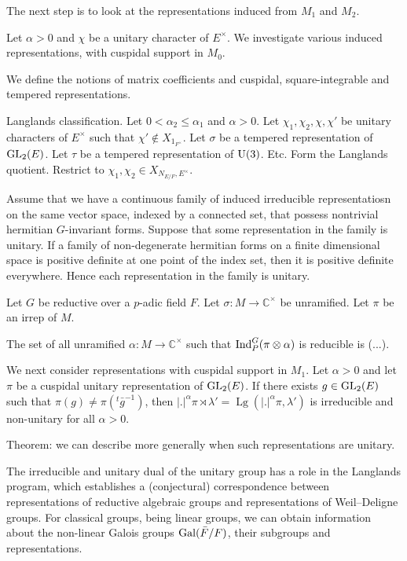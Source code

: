 \documentclass[reqno]{amsart} 
\numberwithin{theorem}{section}
\numberwithin{equation}{section}
\begin{document}
The next step is to look at the representations induced from $M_1$ and $M_2$.

Let $\alpha > 0$ and $\chi$ be a unitary character of $E^\times$.  We investigate various induced representations, with cuspidal support in $M_0$.

We define the notions of matrix coefficients and cuspidal, square-integrable and tempered representations.

Langlands classification.  Let $0 < \alpha_2 \leq \alpha_1$ and $\alpha > 0$.  Let $\chi_1, \chi_2, \chi, \chi '$ be unitary characters of $E^\times$ such that $\chi ' \notin X_{1_{F^\times}}$.  Let $\sigma$ be a tempered representation of $\operatorname{GL}_2(E)$.  Let $\tau$ be a tempered representation of $\operatorname{U}(3)$.  Etc.  Form the Langlands quotient.  Restrict to $\chi_1, \chi_2 \in X_{N_{E/F}, E^\times}$.

\begin{lemma}
  Assume that we have a continuous family of induced irreducible representatiosn on the same vector space, indexed by a connected set, that possess nontrivial hermitian $G$-invariant forms.  Suppose that some representation in the family is unitary.  If a family of non-degenerate hermitian forms on a finite dimensional space is positive definite at one point of the index set, then it is positive definite everywhere.  Hence each representation in the family is unitary.
\end{lemma}

Let $G$ be reductive over a $p$-adic field $F$.  Let $\sigma : M \rightarrow \mathbb{C}^\times$ be unramified.  Let $\pi$ be an irrep of $M$.
\begin{lemma}
  The set of all unramified $\alpha : M \rightarrow \mathbb{C}^\times$ such that $\operatorname{Ind}_P^G(\pi \otimes \alpha)$ is reducible is (...).
\end{lemma}

We next consider representations with cuspidal support in $M_1$.  Let $\alpha > 0$ and let $\pi$ be a cuspidal unitary representation of $\operatorname{GL}_2(E)$.  If there exists $g \in \operatorname{GL}_2(E)$ such that $\pi(g) \neq \pi({}^t \bar{g}^{-1})$, then $\lvert . \rvert^\alpha \pi \rtimes \lambda ' = \operatorname{Lg}(\lvert . \rvert^\alpha \pi, \lambda ')$ is irreducible and non-unitary for all $\alpha > 0$.

Theorem: we can describe more generally when such representations are unitary.

The irreducible and unitary dual of the unitary group has a role in the Langlands program, which establishes a (conjectural) correspondence between representations of reductive algebraic groups and representations of Weil--Deligne groups.  For classical groups, being linear groups, we can obtain information about the non-linear Galois groups $\operatorname{Gal}(\bar{F}/F)$, their subgroups and representations.
\end{document}
